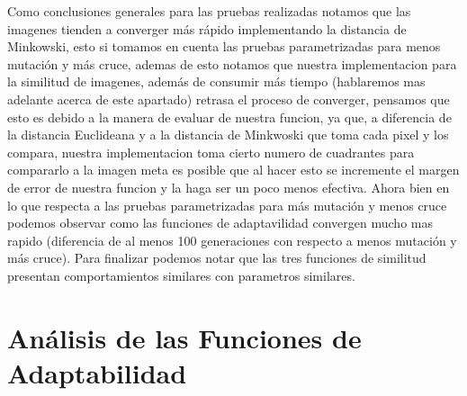 \documentclass[conference]{C:/Program Files (x86)/MiKTeX 2.9/tex/latex/ltxmisc/IEEEtran}
\begin{document}
Como conclusiones generales para las pruebas realizadas notamos que las imagenes tienden a converger más rápido implementando la distancia de Minkowski, esto si tomamos en cuenta las pruebas parametrizadas para menos mutación y más cruce, ademas de esto notamos que nuestra implementacion para la similitud de imagenes, además de consumir más tiempo (hablaremos mas adelante acerca de este apartado) retrasa el proceso de converger, pensamos que esto es debido a la manera de evaluar de nuestra funcion, ya que, a diferencia de la distancia Euclideana y a la distancia de Minkwoski que toma cada pixel y los compara, nuestra implementacion toma cierto numero de cuadrantes para compararlo a la imagen meta es posible que al hacer esto se incremente el margen de error de nuestra funcion y la haga ser un poco menos efectiva. Ahora bien en lo que respecta a las pruebas parametrizadas para más mutación y menos cruce podemos observar como las funciones de adaptavilidad convergen mucho mas rapido (diferencia de al menos 100 generaciones con respecto a menos mutación y más cruce).
Para finalizar podemos notar que las tres funciones de similitud presentan comportamientos similares con parametros similares. 

\section{Análisis de las Funciones de Adaptabilidad}


%
%
\end{document}
